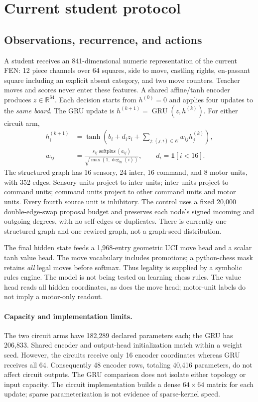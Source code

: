 \documentclass[10pt]{article}
\begin{document}
\section{Current student protocol}
\subsection{Observations, recurrence, and actions}
A student receives an 841-dimensional numeric representation of the current
FEN: 12 piece channels over 64 squares, side to move, castling rights,
en-passant square including an explicit absent category, and two move counters.
Teacher moves and scores never enter these features. A shared affine/tanh
encoder produces $z\in\mathbb{R}^{64}$. Each decision starts from
$h^{(0)}=0$ and applies four updates to the \emph{same board}.
The GRU update is $h^{(k+1)}=\operatorname{GRU}(z,h^{(k)})$.
For either circuit arm,
\begin{align}
 h_i^{(k+1)} &= \tanh\!\left(b_i+d_i z_i+
                    \sum_{j:(j,i)\in E} w_{ij}h_j^{(k)}\right),\\
 w_{ij} &= \frac{s_{ij}\operatorname{softplus}(a_{ij})}
                    {\sqrt{\max(1,\deg_{\mathrm{in}}(i))}},
 \qquad d_i=\mathbf{1}[i<16].
\end{align}
The structured graph has 16 sensory, 24 inter, 16 command, and 8 motor units,
with 352 edges. Sensory units project to inter units; inter units project to
command units; command units project to other command units and motor units.
Every fourth source unit is inhibitory. The control uses a fixed 20,000
double-edge-swap proposal budget and preserves each node's signed incoming and
outgoing degrees, with no self-edges or duplicates. There is currently one
structured graph and one rewired graph, not a graph-seed distribution.

The final hidden state feeds a 1,968-entry geometric UCI move head and a scalar
tanh value head. The move vocabulary includes promotions; a python-chess mask
retains \emph{all} legal moves before softmax. Thus legality is supplied by a
symbolic rules engine. The model is not being tested on learning chess rules.
The value head reads all hidden coordinates, as does the move head; motor-unit
labels do not imply a motor-only readout.

\paragraph{Capacity and implementation limits.}
The two circuit arms have 182,289 declared parameters each; the GRU has 206,833.
Shared encoder and output-head initialization match within a weight seed.
However, the circuits receive only 16 encoder coordinates whereas GRU receives
all 64. Consequently 48 encoder rows, totaling 40,416 parameters, do not affect
circuit outputs. The GRU comparison does not isolate either topology or input
capacity. The circuit implementation builds a dense $64\times64$ matrix for
each update; sparse parameterization is not evidence of sparse-kernel speed.
\end{document}
